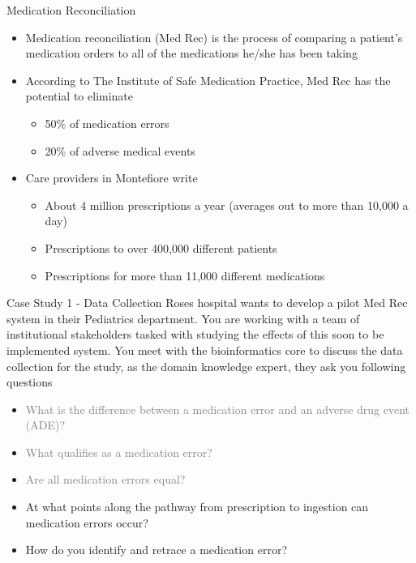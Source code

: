 \documentclass[10pt]{beamer}
\begin{document}
\begin{frame}{Medication Reconciliation}
	\begin{itemize}
		\item Medication reconciliation (Med Rec) is the process of comparing a patient's medication orders to all of the medications he/she has been taking
		\item According to The Institute of Safe Medication Practice, Med Rec has the potential to eliminate
		\begin{itemize}
			\item 50\% of medication errors
			\item 20\% of adverse medical events
		\end{itemize}
		\item Care providers in Montefiore write 
		\begin{itemize}
			\item About 4 million prescriptions a year (averages out to more than 10,000 a day)
			\item Prescriptions to over 400,000 different patients
			\item Prescriptions for more than 11,000 different medications
		\end{itemize}		   
	\end{itemize}
\end{frame}

\begin{frame}{Case Study 1 - Data Collection}
	Roses hospital wants to develop a pilot Med Rec system in their Pediatrics department.  You are working with a team of institutional stakeholders tasked with studying the effects of this soon to be implemented system.  You meet with the bioinformatics core to discuss the data collection for the study, as the domain knowledge expert, they ask you following questions 
	\begin{itemize}
		\item \textcolor<2->{gray}{What is the difference between a medication error and an adverse drug event (ADE)?}
		\item \textcolor<2->{gray}{What qualifies as a medication error?}
		\item \textcolor<2->{gray}{Are all medication errors equal?}
		\item<2-> At what points along the pathway from prescription to ingestion can medication errors occur?
		\item<2-> How do you identify and retrace a medication error?
	\end{itemize}	 
\end{frame}
\end{document}
